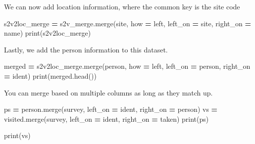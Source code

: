 \documentclass[
  letterpaper,
]{scrbook}
\newenvironment{Shaded}{\begin{snugshade}}{\end{snugshade}}
\newcommand{\BuiltInTok}[1]{#1}
\newcommand{\NormalTok}[1]{#1}
\newcommand{\OperatorTok}[1]{\textcolor[rgb]{0.81,0.36,0.00}{\textbf{#1}}}
\newcommand{\StringTok}[1]{\textcolor[rgb]{0.31,0.60,0.02}{#1}}
\begin{document}
We can now add location information, where the common key is the site code

\begin{Shaded}
\begin{Highlighting}[]
\NormalTok{s2v2loc\_merge }\OperatorTok{=}\NormalTok{ s2v\_merge.merge(site, how }\OperatorTok{=} \StringTok{\textquotesingle{}left\textquotesingle{}}\NormalTok{, left\_on }\OperatorTok{=} \StringTok{\textquotesingle{}site\textquotesingle{}}\NormalTok{, right\_on }\OperatorTok{=} \StringTok{\textquotesingle{}name\textquotesingle{}}\NormalTok{)}
\BuiltInTok{print}\NormalTok{(s2v2loc\_merge)}
\end{Highlighting}
\end{Shaded}

Lastly, we add the person information to this dataset.

\begin{Shaded}
\begin{Highlighting}[]
\NormalTok{merged }\OperatorTok{=}\NormalTok{ s2v2loc\_merge.merge(person, how }\OperatorTok{=} \StringTok{\textquotesingle{}left\textquotesingle{}}\NormalTok{, left\_on }\OperatorTok{=} \StringTok{\textquotesingle{}person\textquotesingle{}}\NormalTok{, right\_on }\OperatorTok{=} \StringTok{\textquotesingle{}ident\textquotesingle{}}\NormalTok{)}
\BuiltInTok{print}\NormalTok{(merged.head())}
\end{Highlighting}
\end{Shaded}

You can merge based on multiple columns as long as they match up.

\begin{Shaded}
\begin{Highlighting}[]
\NormalTok{ps }\OperatorTok{=}\NormalTok{ person.merge(survey, left\_on }\OperatorTok{=} \StringTok{\textquotesingle{}ident\textquotesingle{}}\NormalTok{, right\_on }\OperatorTok{=} \StringTok{\textquotesingle{}person\textquotesingle{}}\NormalTok{)}
\NormalTok{vs }\OperatorTok{=}\NormalTok{ visited.merge(survey, left\_on }\OperatorTok{=} \StringTok{\textquotesingle{}ident\textquotesingle{}}\NormalTok{, right\_on }\OperatorTok{=} \StringTok{\textquotesingle{}taken\textquotesingle{}}\NormalTok{)}
\BuiltInTok{print}\NormalTok{(ps)}
\end{Highlighting}
\end{Shaded}

\begin{Shaded}
\begin{Highlighting}[]
\BuiltInTok{print}\NormalTok{(vs)}
\end{Highlighting}
\end{Shaded}
\end{document}
